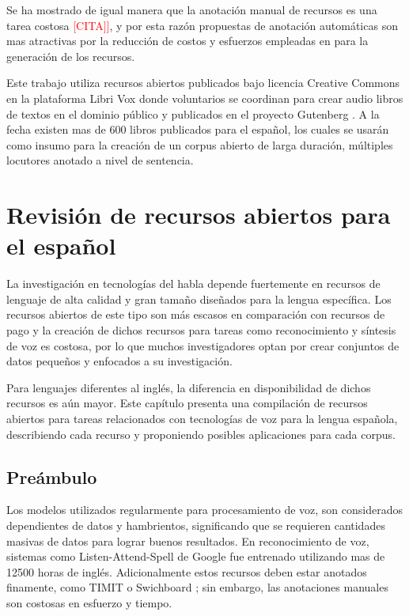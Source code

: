 \documentclass[a4paper,12pt,twoside]{report}
\begin{document}
Se ha mostrado de igual manera que la anotación manual de recursos es una tarea costosa \textcolor{red}{[CITA]]}, y por esta razón propuestas de anotación automáticas son mas atractivas por la reducción de costos y esfuerzos empleadas en para la generación de los recursos.

Este trabajo utiliza recursos abiertos publicados bajo licencia Creative Commons en la plataforma Libri Vox \cite{LibriVox} donde voluntarios se coordinan para crear audio libros de textos en el dominio público y publicados en el proyecto Gutenberg \cite{gutenberg}. A la fecha existen mas de 600 libros publicados para el español, los cuales se usarán como insumo para la creación de un corpus abierto de larga duración, múltiples locutores anotado a nivel de sentencia.

\chapter{Revisión de recursos abiertos para el español}

La investigación en tecnologías del habla depende fuertemente en recursos de lenguaje de alta calidad y gran tamaño diseñados para la lengua específica. Los recursos abiertos de este tipo son más escasos en comparación con recursos de pago y la creación de dichos recursos para tareas como reconocimiento y síntesis de voz es costosa, por lo que muchos investigadores optan por crear conjuntos de datos pequeños y enfocados a su investigación.

Para lenguajes diferentes al inglés, la diferencia en disponibilidad de dichos recursos es aún mayor. Este capítulo presenta una compilación de recursos abiertos para tareas relacionados con tecnologías de voz para la lengua española, describiendo cada recurso y proponiendo posibles aplicaciones para cada corpus.

\section{Preámbulo}

Los modelos utilizados regularmente para procesamiento de voz, son considerados dependientes de datos y hambrientos, significando que se requieren cantidades masivas de datos para lograr buenos resultados. En reconocimiento de voz, sistemas como Listen-Attend-Spell de Google \cite{Chiu2018} fue entrenado utilizando mas de 12500 horas de inglés. Adicionalmente estos recursos deben estar anotados finamente, como TIMIT \cite{TIMIT} o Swichboard \cite{Switchboard}; sin embargo, las anotaciones manuales son costosas en esfuerzo y tiempo.
\end{document}
